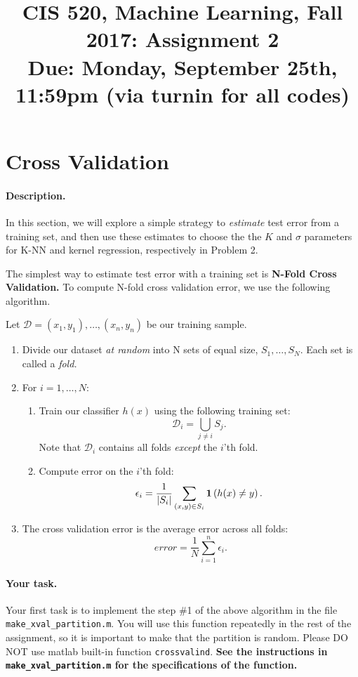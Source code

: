 \documentclass[english]{article}
\title{CIS 520, Machine Learning, Fall 2017: Assignment 2\\
Due: Monday, September 25th, 11:59pm (via turnin for all codes)
\ifthenelse{\boolean{ShowSolutions}}{ \\ \bf Solutions }{} }
\date{}
\begin{document}
\maketitle


\section{Cross Validation }

\paragraph{Description.} In this section, we will explore a simple
strategy to {\em estimate} test error from a training set, and then use these estimates to choose the the $K$ and $\sigma$ parameters for
K-NN and kernel regression, respectively in Problem 2.

The simplest way to estimate test error with a training set is {\bf
  N-Fold Cross Validation.} To compute N-fold cross validation error,
we use the following algorithm. 

Let $\mathcal{D} = (x_1, y_1), \dots,
(x_n, y_n)$ be our training sample.
\begin{enumerate}
\item Divide our dataset {\em at random} into N sets of equal size, $S_1, \dots,
  S_N$. Each set is called a {\em fold.}
\item For $i = 1, \dots, N:$ 
  \begin{enumerate}
  \item Train our classifier $h(x)$ using the following training set:
    $$\mathcal{D}_i = \bigcup_{j\ne i} S_j.$$
    Note that $\mathcal{D}_i$ contains all folds {\em except} the $i$'th fold.
  \item Compute error on the $i$'th fold:
    $$\epsilon_i = \frac{1}{|S_i|}\sum_{(x,y) \in S_i} \mathbf{1}\left(h(x) \ne y\right).$$
  \end{enumerate}
\item The cross validation error is the average error across all folds:
  $$error = \frac{1}{N} \sum_{i=1}^n \epsilon_i.$$
\end{enumerate}

\paragraph{Your task.} Your first task is to implement the step \#1 of the above algorithm in the file {\tt make\_xval\_partition.m}. 
You will use this function repeatedly in the rest of the assignment, so it is important to make that the partition is random. 
Please DO NOT use matlab built-in function {\tt crossvalind}. {\bf See the instructions in {\tt make\_xval\_partition.m} for the specifications of the function.}
\end{document}
